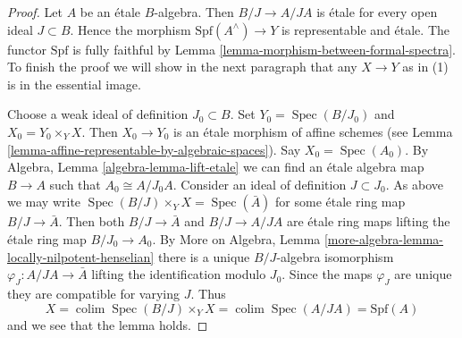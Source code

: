 \documentclass{stacks-project}
\theoremstyle{plain}
\theoremstyle{definition}
\theoremstyle{remark}
\numberwithin{equation}{subsection}
\def\colim{\mathop{\mathrm{colim}}\nolimits}
\def\Spec{\mathop{\mathrm{Spec}}}
\begin{document}
\begin{proof}
Let $A$ be an \'etale $B$-algebra. Then $B/J \to A/JA$ is
\'etale for every open ideal $J \subset B$. Hence
the morphism $\text{Spf}(A^\wedge) \to Y$ is representable and \'etale.
The functor $\text{Spf}$ is fully faithful by
Lemma \ref{lemma-morphism-between-formal-spectra}.
To finish the proof we will show in the next paragraph
that any $X \to Y$ as in (1) is in the essential image.

\medskip\noindent
Choose a weak ideal of definition $J_0 \subset B$. Set
$Y_0 = \Spec(B/J_0)$ and $X_0 = Y_0 \times_Y X$. Then $X_0 \to Y_0$
is an \'etale morphism of affine schemes (see
Lemma \ref{lemma-affine-representable-by-algebraic-spaces}).
Say $X_0 = \Spec(A_0)$. By Algebra, Lemma \ref{algebra-lemma-lift-etale}
we can find an \'etale algebra map $B \to A$ such that
$A_0 \cong A/J_0A$. Consider an ideal of definition $J \subset J_0$.
As above we may write $\Spec(B/J) \times_Y X = \Spec(\bar A)$
for some \'etale ring map $B/J \to \bar A$. Then both
$B/J \to \bar A$ and $B/J \to A/JA$ are \'etale ring maps
lifting the \'etale ring map $B/J_0 \to A_0$. By
More on Algebra, Lemma \ref{more-algebra-lemma-locally-nilpotent-henselian}
there is a unique $B/J$-algebra isomorphism
$\varphi_J : A/JA \to \bar A$ lifting the identification modulo $J_0$.
Since the maps $\varphi_J$ are unique they are compatible for varying $J$.
Thus
$$
X = \colim \Spec(B/J) \times_Y X = \colim \Spec(A/JA) = \text{Spf}(A)
$$
and we see that the lemma holds.
\end{proof}
\end{document}
